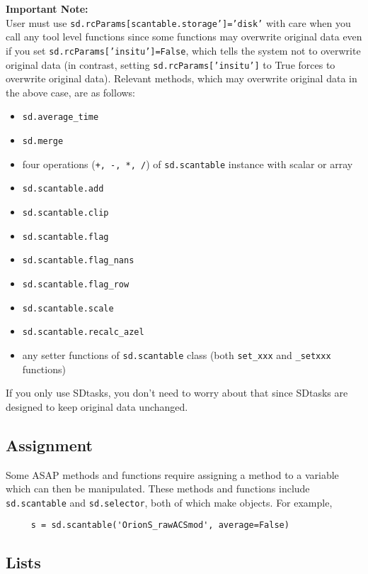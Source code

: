 {\bf Important Note:}\\
User must use {\tt sd.rcParams[scantable.storage']='disk'} with care when 
you call any tool level functions since some functions may overwrite original data 
even if you set {\tt sd.rcParams['insitu']=False}, which tells the system not to 
overwrite original data (in contrast, setting {\tt sd.rcParams['insitu']} to True 
forces to overwrite original data). 
Relevant methods, which may overwrite original data in the above case, are as follows:
\small
\begin{itemize}
   \item {\tt sd.average\_time}
   \item {\tt sd.merge}
   \item four operations ({\tt +, -, *, /}) of {\tt sd.scantable} instance with scalar or array
   \item {\tt sd.scantable.add}
   \item {\tt sd.scantable.clip}
   \item {\tt sd.scantable.flag}
   \item {\tt sd.scantable.flag\_nans}
   \item {\tt sd.scantable.flag\_row}
   \item {\tt sd.scantable.scale}
   \item {\tt sd.scantable.recalc\_azel}
   \item any setter functions of {\tt sd.scantable} class (both {\tt set\_xxx} and {\tt \_setxxx} functions)
\end{itemize}
\normalsize
If you only use SDtasks, you don't need to worry about that since 
SDtasks are designed to keep original data unchanged.  

\subsection{Assignment}
\label{section:sd.intro.ass}

Some ASAP methods and functions require assigning a method
to a variable which can then be manipulated.  These methods and functions include
{\tt sd.scantable} and {\tt sd.selector}, both of which make objects.
For example,
\small
\begin{verbatim}
     s = sd.scantable('OrionS_rawACSmod', average=False) 
\end{verbatim}
\normalsize

\subsection{Lists}
\label{section:sd.intro.lists}

